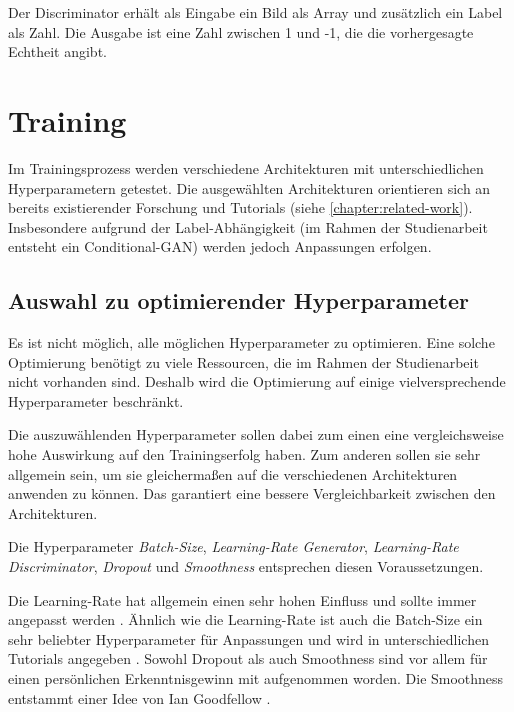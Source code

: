 Der Discriminator erhält als Eingabe ein Bild als Array und zusätzlich ein Label als Zahl.
Die Ausgabe ist eine Zahl zwischen 1 und -1, die die vorhergesagte Echtheit angibt.

\section{Training}
Im Trainingsprozess werden verschiedene Architekturen mit unterschiedlichen Hyperparametern getestet.
Die ausgewählten Architekturen orientieren sich an bereits existierender Forschung und Tutorials (siehe \cref{chapter:related-work}).
Insbesondere aufgrund der Label-Abhängigkeit (im Rahmen der Studienarbeit entsteht ein Conditional-GAN) werden jedoch Anpassungen erfolgen.


\subsection{Auswahl zu optimierender Hyperparameter}
Es ist nicht möglich, alle möglichen Hyperparameter zu optimieren.
Eine solche Optimierung benötigt zu viele Ressourcen, die im Rahmen der Studienarbeit nicht vorhanden sind.
Deshalb wird die Optimierung auf einige vielversprechende Hyperparameter beschränkt.
\newline

Die auszuwählenden Hyperparameter sollen dabei zum einen eine vergleichsweise hohe Auswirkung auf den Trainingserfolg haben.
Zum anderen sollen sie sehr allgemein sein, um sie gleichermaßen auf die verschiedenen Architekturen anwenden zu können.
Das garantiert eine bessere Vergleichbarkeit zwischen den Architekturen.
\newline

Die Hyperparameter \textit{Batch-Size}, \textit{Learning-Rate Generator}, \textit{Learning-Rate Discriminator}, \textit{Dropout} und \textit{Smoothness} entsprechen diesen Voraussetzungen.
\newline

Die Learning-Rate hat allgemein einen sehr hohen Einfluss und sollte immer angepasst werden \cite{learning-rate-most-important}.
Ähnlich wie die Learning-Rate ist auch die Batch-Size ein sehr beliebter Hyperparameter für Anpassungen und wird in unterschiedlichen Tutorials angegeben \cite{tutorial:tune-batch-size-analyticsvidhya, tutorial:tune-batch-size-machinelearningmastery} .
Sowohl Dropout als auch Smoothness sind vor allem für einen persönlichen Erkenntnisgewinn mit aufgenommen worden.
Die Smoothness entstammt einer Idee von Ian Goodfellow \cite{ian-goodfellow-onesided-label-smoothing}.


